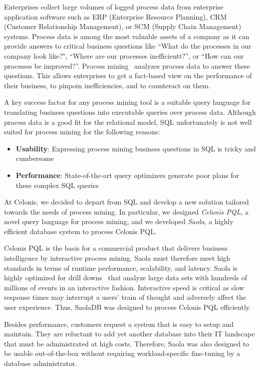 Enterprises collect large volumes of logged process data from enterprise application software
such as ERP (Enterprise Resource Planning), CRM (Customer Relationship Management),
or SCM (Supply Chain Management) systems. Process data is among the most
valuable assets of a company as it can provide answers to critical business
questions like ``What do the processes in our company look like?", ``Where are
our processes inefficientt?'', or ``How can our processes be improved?''. Process
mining~\cite{process-mining} analyzes process data to answer these questions.
This allows enterprises to get a fact-based view on the performance of their
business, to pinpoin inefficiencies, and to counteract on them.

A key success factor for any process mining tool is a suitable query
language for translating business questions into executable queries over process data. 
Although process data is a good fit for the relational model, SQL unfortunately is not well suited for process mining for the following reasons:

\begin{itemize}
\item \textbf{Usability}: Expressing process mining business questions in SQL is tricky and cumbersome
\item \textbf{Performance}: State-of-the-art query optimizers generate poor plans for these complex SQL queries
\end{itemize}

At Celonis, we decided to depart from SQL and develop a new solution tailored
towards the needs of process mining. In particular, we designed \emph{Celonis PQL}, a novel query language for process mining, and we developed \emph{Saola}, a highly efficient database system to process Celonis PQL. 

Celonis PQL is the basis for a commercial product that delivers business
intelligence by interactive process mining. Saola must therefore meet high 
standards in terms of runtime performance, scalability, and latency. 
Saola is highly optimized for drill downs~\cite{drill-down} that
analyze large data sets with hundreds of millions of events in an interactive
fashion. Interactive speed is critical as slow response times
may interrupt a users' train of thought and adversely affect the user
experience. Thus, SaolaDB was designed to process Celonis PQL efficiently.

Besides performance, customers request a system that is easy to setup and maintain. They are reluctant to add yet another database into their IT landscape that must be administrated at high costs. Therefore, Saola was also designed to be usable out-of-the-box without requiring workload-specific fine-tuning by a database administrator.

